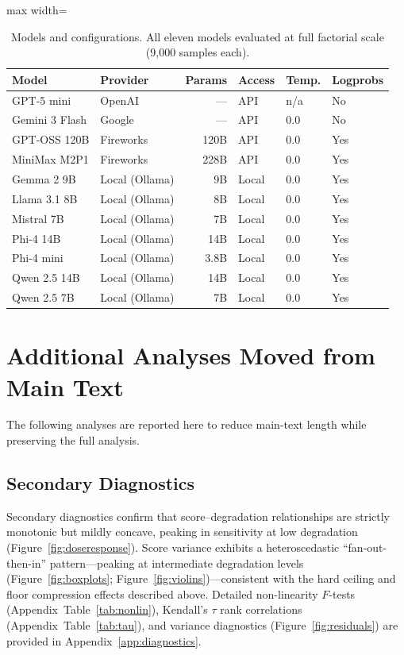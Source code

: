 \documentclass[11pt]{article}
\begin{document}
\begin{table}[htbp]
\centering
\caption{Models and configurations. All eleven models evaluated at
full factorial scale (9{,}000 samples each).}
\label{tab:models}
\begin{adjustbox}{max width=\columnwidth}
\begin{tabular}{@{}llrlll@{}}
\toprule
\textbf{Model} & \textbf{Provider} & \textbf{Params} & \textbf{Access}
& \textbf{Temp.} & \textbf{Logprobs} \\
\midrule
GPT-5 mini      & OpenAI         & ---  & API   & n/a & No  \\
Gemini 3 Flash  & Google         & ---  & API   & 0.0 & No  \\
GPT-OSS 120B    & Fireworks      & 120B & API   & 0.0 & Yes \\
MiniMax M2P1    & Fireworks      & 228B & API   & 0.0 & Yes \\
Gemma 2 9B      & Local (Ollama) & 9B   & Local & 0.0 & Yes \\
Llama 3.1 8B    & Local (Ollama) & 8B   & Local & 0.0 & Yes \\
Mistral 7B      & Local (Ollama) & 7B   & Local & 0.0 & Yes \\
Phi-4 14B       & Local (Ollama) & 14B  & Local & 0.0 & Yes \\
Phi-4 mini      & Local (Ollama) & 3.8B & Local & 0.0 & Yes \\
Qwen 2.5 14B    & Local (Ollama) & 14B  & Local & 0.0 & Yes \\
Qwen 2.5 7B     & Local (Ollama) & 7B   & Local & 0.0 & Yes \\
\bottomrule
\end{tabular}
\end{adjustbox}
\end{table}

\section{Additional Analyses Moved from Main Text}
\label{app:movedanalyses}

The following analyses are reported here to reduce main-text length while
preserving the full analysis.

\subsection{Secondary Diagnostics}
\label{app:secondary_diagnostics}

Secondary diagnostics confirm that score--degradation relationships
are strictly monotonic but mildly concave, peaking in sensitivity at
low degradation (Figure~\ref{fig:doseresponse}). Score variance
exhibits a heteroscedastic ``fan-out-then-in'' pattern---peaking at
intermediate degradation levels (Figure~\ref{fig:boxplots};
Figure~\ref{fig:violins})---consistent with the hard ceiling and
floor compression effects described above. Detailed non-linearity
$F$-tests (Appendix~Table~\ref{tab:nonlin}), Kendall's $\tau$ rank
correlations (Appendix~Table~\ref{tab:tau}), and variance diagnostics
(Figure~\ref{fig:residuals}) are provided in
Appendix~\ref{app:diagnostics}.
\end{document}
